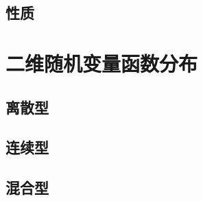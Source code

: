 \documentclass[UTF8, 12pt]{ctexart}
\begin{document}
\subsection{性质}

\section{二维随机变量函数分布}

\subsection{离散型}

\subsection{连续型}

\subsection{混合型}
\end{document}
